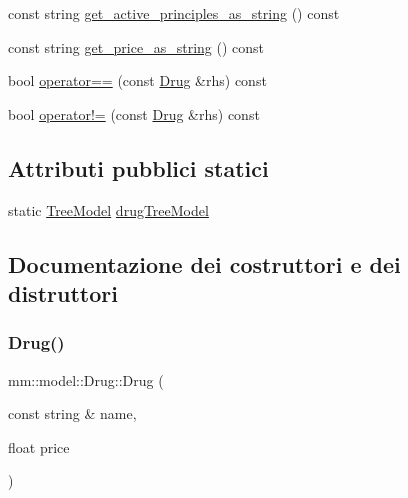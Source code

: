 \begin{DoxyCompactItemize}
\item 
const string \mbox{\hyperlink{classmm_1_1model_1_1_drug_aaa9a406540607aed5845bb6af20b1231}{get\+\_\+active\+\_\+principles\+\_\+as\+\_\+string}} () const
\item 
const string \mbox{\hyperlink{classmm_1_1model_1_1_drug_ab5bfd8748a32b0cb366c4bf29633f00a}{get\+\_\+price\+\_\+as\+\_\+string}} () const
\item 
bool \mbox{\hyperlink{classmm_1_1model_1_1_drug_a15151e60eef91b544c63d8ff55db7bab}{operator==}} (const \mbox{\hyperlink{classmm_1_1model_1_1_drug}{Drug}} \&rhs) const
\item 
bool \mbox{\hyperlink{classmm_1_1model_1_1_drug_a51d9c5692835cab9d206580ccf8d0e1e}{operator!=}} (const \mbox{\hyperlink{classmm_1_1model_1_1_drug}{Drug}} \&rhs) const
\end{DoxyCompactItemize}
\subsection*{Attributi pubblici statici}
\begin{DoxyCompactItemize}
\item 
static \mbox{\hyperlink{structmm_1_1model_1_1_drug_1_1_tree_model}{Tree\+Model}} \mbox{\hyperlink{classmm_1_1model_1_1_drug_a9169612d0fc3b3b25063a1686be30af9}{drug\+Tree\+Model}}
\end{DoxyCompactItemize}


\subsection{Documentazione dei costruttori e dei distruttori}
\mbox{\label{classmm_1_1model_1_1_drug_a23f6e0538f52bd77fb8fa511392889a6}} 
\subsubsection{\texorpdfstring{Drug()}{Drug()}\hspace{0.1cm}{\footnotesize\ttfamily [1/2]}}
{\footnotesize\ttfamily mm\+::model\+::\+Drug\+::\+Drug (\begin{DoxyParamCaption}\item[{const string \&}]{name,  }\item[{float}]{price }\end{DoxyParamCaption})}

